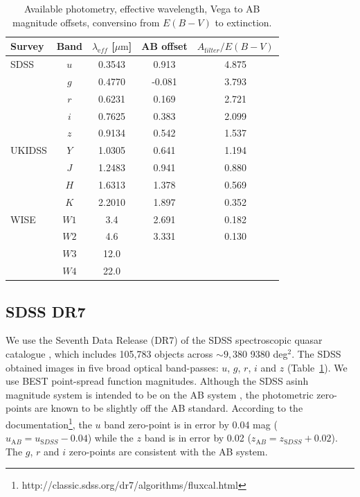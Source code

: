 \begin{table}
  \small
  \centering
  \begin{tabular}{lcccc}
    \hline 
    Survey & Band & $\lambda_{\mathrm eff}$ [$\mu{\mathrm m}$] & AB offset & $A_{\mathrm filter}/E(B-V)$ \\
    \hline 
    SDSS & $u$ & 0.3543 &  0.913 & 4.875 \\
         & $g$ & 0.4770 & -0.081 & 3.793 \\
         & $r$ & 0.6231 &  0.169 & 2.721 \\
         & $i$ & 0.7625 &  0.383 & 2.099 \\
         & $z$ & 0.9134 &  0.542 & 1.537 \\
    UKIDSS & $Y$ & 1.0305 &  0.641 & 1.194 \\
           & $J$ & 1.2483 &  0.941 & 0.880 \\
           & $H$ & 1.6313 &  1.378 & 0.569 \\
           & $K$ & 2.2010 &  1.897 & 0.352 \\
    WISE & $W1$ & 3.4 & 2.691 & 0.182\\
         & $W2$ & 4.6 & 3.331 & 0.130\\
         & $W3$ & 12.0 & & \\
         & $W4$ & 22.0 & & \\           
    \hline
  \end{tabular}
  \caption[{Available photometry, effective wavelength, Vega to AB magnitude offsets, conversion from $E(B-V)$ to extinction.}]{Available photometry, effective wavelength, Vega to AB magnitude offsets, conversino from $E(B-V)$ to extinction. }
  \label{tab:photometry}
\end{table}

\subsection{SDSS DR7}

We use the Seventh Data Release (DR7) of the SDSS spectroscopic quasar catalogue \citep{schneider10}, which includes 105,783 objects across $\sim 9,380$ 9380 deg$^2$. 
The SDSS obtained images in five broad optical band-passes: $u$, $g$, $r$, $i$ and $z$ (Table~\ref{tab:photometry}).  
We use BEST point-spread function magnitudes.
Although the SDSS asinh magnitude system is intended to be on the AB system \citep{oke83}, the photometric zero-points are known to be slightly off the AB standard. 
According to the documentation\footnote{http://classic.sdss.org/dr7/algorithms/fluxcal.html}, the $u$ band zero-point is in error by 0.04 mag ($u_{\mathrm AB} = u_{\mathrm SDSS} - 0.04$) while the $z$ band is in error by 0.02 ($z_{\mathrm AB} = z_{\mathrm SDSS} + 0.02$). 
The $g$, $r$ and $i$ zero-points are consistent with the AB system. 

